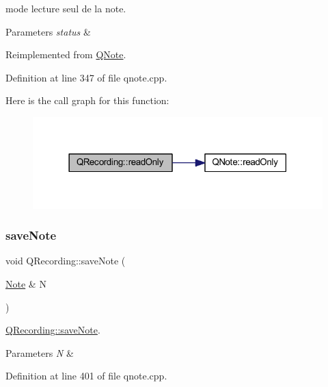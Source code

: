 mode lecture seul de la note. 


\begin{DoxyParams}{Parameters}
{\em status} & \\
\hline
\end{DoxyParams}


Reimplemented from \hyperlink{class_q_note_ae6fb14b839acc1979b145a892d6a0a92}{Q\+Note}.



Definition at line 347 of file qnote.\+cpp.

Here is the call graph for this function\+:\nopagebreak
\begin{figure}[H]
\begin{center}
\leavevmode
\includegraphics[width=318pt]{class_q_recording_a98fa21d8814450c0d912c8ce102ca832_cgraph}
\end{center}
\end{figure}
\mbox{\label{class_q_recording_a37492f3dbda2dad2a8cd62012fe91b78}} 
\subsubsection{\texorpdfstring{save\+Note}{saveNote}}
{\footnotesize\ttfamily void Q\+Recording\+::save\+Note (\begin{DoxyParamCaption}\item[{\hyperlink{class_note}{Note} \&}]{N }\end{DoxyParamCaption})\hspace{0.3cm}{\ttfamily [slot]}}



\hyperlink{class_q_recording_a37492f3dbda2dad2a8cd62012fe91b78}{Q\+Recording\+::save\+Note}. 


\begin{DoxyParams}{Parameters}
{\em N} & \\
\hline
\end{DoxyParams}


Definition at line 401 of file qnote.\+cpp.

